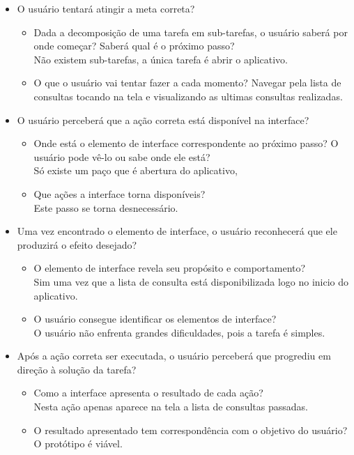 \begin{itemize}
\item O usuário tentará atingir a meta correta?
    \begin{itemize}
    \item Dada a decomposição de uma tarefa em sub-tarefas, o usuário saberá por onde começar? 
        Saberá qual é o próximo passo? \\
        Não existem sub-tarefas, a única tarefa é abrir o aplicativo.
    \item O que o usuário vai tentar fazer a cada momento?
        Navegar pela lista de consultas tocando na tela e visualizando as ultimas consultas realizadas.
    \end{itemize}
\item O usuário perceberá que a ação correta está disponível na interface?
    \begin{itemize}
        \item Onde está o elemento de interface correspondente ao próximo passo? O usuário pode vê-lo 
            ou sabe onde ele está? \\
        Só existe um paço que é abertura do aplicativo,
    \item Que ações a interface torna disponíveis? \\
       Este passo se torna desnecessário.
    \end{itemize}
\item Uma vez encontrado o elemento de interface, o usuário reconhecerá que ele produzirá o 
efeito desejado?
    \begin{itemize}
        \item O elemento de interface revela seu propósito e comportamento? \\
        Sim uma vez que a lista de consulta está disponibilizada logo no inicio do aplicativo.
    \item O usuário consegue identificar os elementos de interface? \\
      O usuário não enfrenta grandes dificuldades, pois a tarefa é simples.
    \end{itemize}
\item Após a ação correta ser executada, o usuário perceberá que progrediu em direção à solução 
da tarefa?
    \begin{itemize}
        \item Como a interface apresenta o resultado de cada ação? \\
        Nesta ação apenas aparece na tela a lista de consultas passadas. 
    \item O resultado apresentado tem correspondência com o objetivo do usuário? \\
      O protótipo é viável.
    \end{itemize}
\end{itemize}

